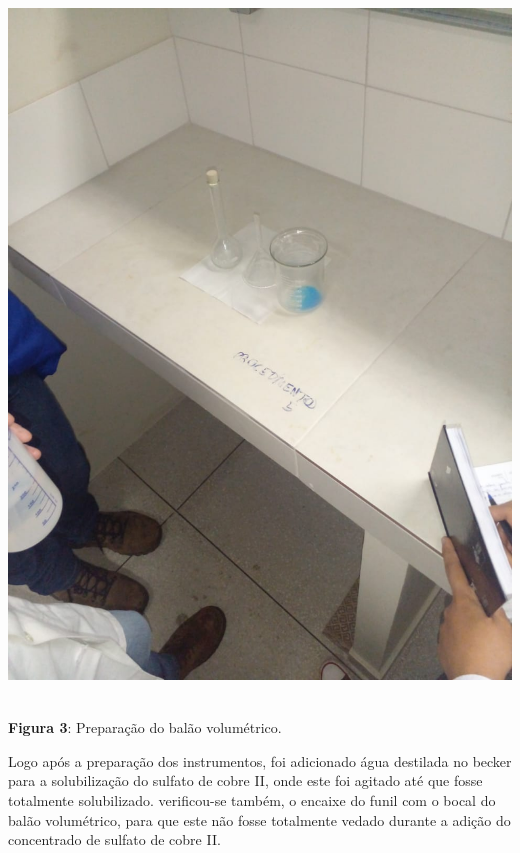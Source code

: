 \documentclass[a4paper, 11pt]{article}
\begin{document}
        \begin{center}
            \parbox{7cm}{\includegraphics[scale=0.2]{01. instrumentos utilizados.jpeg}}\\
            \singlespacing
            \textbf{Figura 3}: Preparação do balão volumétrico\@.
        \end{center}
        \doublespacing

        \indent Logo após a preparação dos instrumentos, foi adicionado água destilada no becker para a solubilização do sulfato de cobre II,
        onde este foi agitado até que fosse totalmente solubilizado\@.
        verificou-se também, o encaixe do funil com o bocal do balão volumétrico, para que este não fosse totalmente vedado durante a
        adição do concentrado de sulfato de cobre II\@.\\
\end{document}
